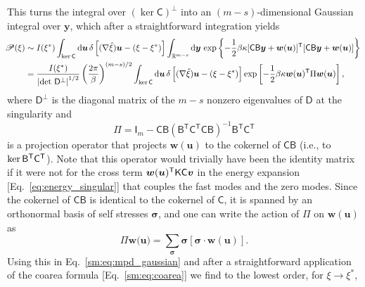 This turns the integral over $(\ker\mathsf{C})^{\perp}$ into an $(m-s)$-dimensional Gaussian integral over $\bm{y}$, which after a straightforward integration yields
%
\begin{equation}
  \hspace{-0.5em}
  \begin{aligned}
    \mathscr{P}(\xi) &\sim I(\xi^{*}) \int_{\ker\mathsf{C}} \mathrm{d}\bm{u}\, \delta\left[(\nabla\hat{\xi})\bm{u} - (\xi - \xi^{*})\right] \int_{\mathbb{R}^{m-s}} \mathrm{d}\bm{y}\, \exp\left\{-\frac{1}{2}\beta\kappa[\mathsf{C}\mathsf{B}\bm{y} + \bm{w}(\bm{u})]^\mathsf{T}[\mathsf{C}\mathsf{B}\bm{y} + \bm{w}(\bm{u})]\right\}\\
                                             &= \frac{I(\xi^{*})}{\left|\det\, \mathsf{D}^\perp\right|^{1/2}} \left(\frac{2\pi}{\beta}\right)^{(m-s)/2} \int_{\ker\mathsf{C}} \mathrm{d}\bm{u}\, \delta\left[(\nabla\hat{\xi})\bm{u} - (\xi - \xi^{*})\right] \exp\left[-\frac{1}{2}\beta\kappa \bm{w}(\bm{u})^\mathsf{T}\Pi \bm{w}(\bm{u})\right],
  \end{aligned}
  \label{sm:eq:mpd_gaussian}
\end{equation}
%
where $\mathsf{D}^\perp$ is the diagonal matrix of the $m - s$ nonzero eigenvalues of $\mathsf{D}$ at the singularity and
%
\begin{equation}
  \Pi = \mathsf{I}_{m} - \mathsf{C}\mathsf{B} (\mathsf{B} ^\mathsf{T}\mathsf{C}^\mathsf{T}\mathsf{C}\mathsf{B} )^{-1}\mathsf{B} ^\mathsf{T}\mathsf{C}^\mathsf{T}
\end{equation}
%
is a projection operator that projects $\bm{w}(\bm{u})$ to the cokernel of $\mathsf{C}\mathsf{B}$ (i.e., to $\ker\mathsf{B}^\mathsf{T}\mathsf{C}^\mathsf{T}$).
Note that this operator would trivially have been the identity matrix if it were not for the cross term $\bm{w}(\bm{u})^\mathsf{T}\mathsf{K}\mathsf{C}\bm{v}$ in the energy expansion [Eq.~\eqref{eq:energy_singular}] that couples the fast modes and the zero modes.
Since the cokernel of $\mathsf{CB}$ is identical to the cokernel of $\mathsf{C}$, it is spanned by an orthonormal basis of self stresses $\bm{\sigma}$, and one can write the action of $\Pi$ on $\bm{w}(\bm{u})$ as
%
\begin{equation}
  \Pi \bm{w}(\bm{u)} = \sum_{\bm{\sigma}} \bm{\sigma}[\bm{\sigma}\cdot\bm{w}(\bm{u})].
  \label{sm:eq:mpd_proj}
\end{equation}
%
Using this in Eq.~\eqref{sm:eq:mpd_gaussian} and after a straightforward application of the coarea formula [Eq.~\eqref{sm:eq:coarea}] we find to the lowest order, for $\xi \to \xi^{*}$,
%
